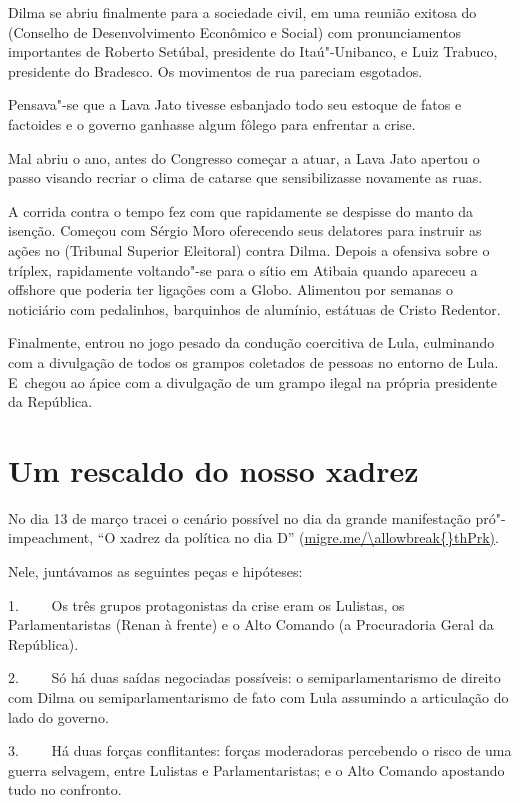 Dilma se abriu finalmente para a sociedade civil, em uma reunião exitosa
do  (Conselho de Desenvolvimento Econômico e Social) com
pronunciamentos importantes de Roberto Setúbal, presidente do
Itaú"-Unibanco, e Luiz Trabuco, presidente do Bradesco. Os movimentos de
rua pareciam esgotados.

Pensava"-se que a Lava Jato tivesse esbanjado todo seu estoque de fatos e
factoides e o governo ganhasse algum fôlego para enfrentar a crise.

Mal abriu o ano, antes do Congresso começar a atuar, a Lava Jato apertou
o passo visando recriar o clima de catarse que sensibilizasse novamente
as ruas.

A corrida contra o tempo fez com que rapidamente se despisse do manto da
isenção. Começou com Sérgio Moro oferecendo seus delatores para instruir
as ações no  (Tribunal Superior Eleitoral) contra Dilma. Depois a
ofensiva sobre o tríplex, rapidamente voltando"-se para o sítio em
Atibaia quando apareceu a offshore que poderia ter ligações com a Globo.
Alimentou por semanas o noticiário com pedalinhos, barquinhos de
alumínio, estátuas de Cristo Redentor.

Finalmente, entrou no jogo pesado da condução coercitiva de Lula,
culminando com a divulgação de todos os grampos coletados de pessoas no
entorno de Lula. E~chegou ao ápice com a divulgação de um grampo ilegal
na própria presidente da República.

\section{Um rescaldo do nosso xadrez}

No dia 13 de março tracei o cenário possível no dia da grande
manifestação pró"-impeachment, ``O xadrez da política no dia D''
(\url{migre.me/\allowbreak{}thPrk)}.

Nele, juntávamos as seguintes peças e hipóteses:

1.~~~~ Os três grupos protagonistas da crise eram os Lulistas, os
Parlamentaristas (Renan à frente) e o Alto Comando (a Procuradoria Geral
da República).

2.~~~~ Só há duas saídas negociadas possíveis: o semiparlamentarismo de
direito com Dilma ou semiparlamentarismo de fato com Lula assumindo a
articulação do lado do governo.

3.~~~~ Há duas forças conflitantes: forças moderadoras percebendo o
risco de uma guerra selvagem, entre Lulistas e Parlamentaristas; e o
Alto Comando apostando tudo no confronto.

